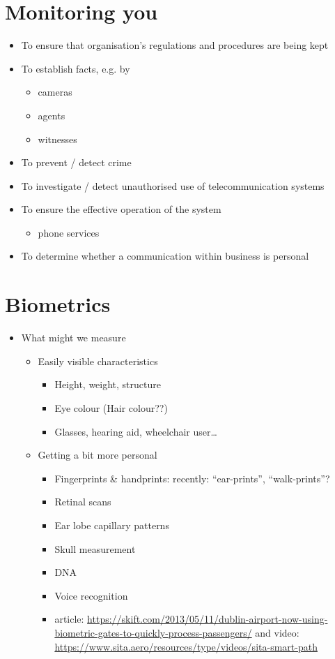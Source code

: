 \documentclass{article}
\begin{document}
\section{Monitoring you}
\begin{itemize}
\item To ensure that organisation's regulations and procedures are being kept
\item To establish facts, e.g. by
\begin{itemize}
\item cameras
\item agents
\item witnesses
\end{itemize}
\item To prevent / detect crime
\item To investigate / detect unauthorised use of telecommunication systems
\item To ensure the effective operation of the system
\begin{itemize}
\item phone services
\end{itemize}
\item To determine whether a communication within business is personal
\end{itemize}



\section{Biometrics}
\begin{itemize}
\item What might we measure
\begin{itemize}
\item Easily visible characteristics
\begin{itemize}
\item Height, weight, structure
\item Eye colour (Hair colour??)
\item Glasses, hearing aid, wheelchair user\ldots
\end{itemize}
\item Getting a bit more personal
\begin{itemize}
\item Fingerprints \& handprints: recently: ``ear-prints'', ``walk-prints''?
\item Retinal scans
\item Ear lobe capillary patterns
\item Skull measurement
\item DNA
\item Voice recognition
\item article: \url{https://skift.com/2013/05/11/dublin-airport-now-using-biometric-gates-to-quickly-process-passengers/} and video: \url{https://www.sita.aero/resources/type/videos/sita-smart-path}
\end{itemize}
\end{itemize}
\end{itemize}
\end{document}
